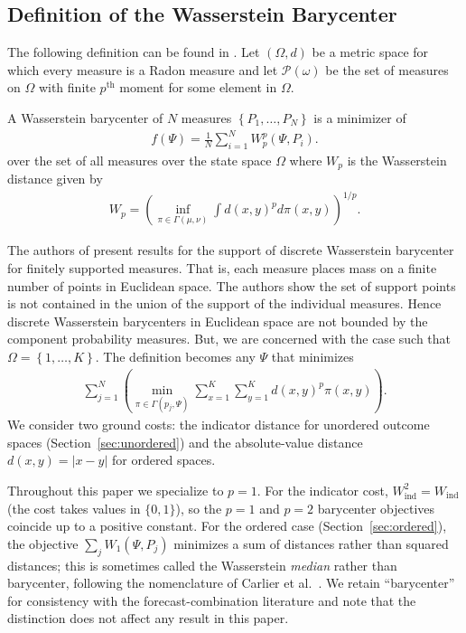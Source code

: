 \subsection{Definition of the Wasserstein Barycenter}
The following definition can be found in \cite{cuturi}.  Let $(\Omega,d)$ be a metric space for which every measure is a Radon measure and let $\mathcal{P}(\omega)$ be the set of measures on $\Omega$ with finite $p^{\text{th}}$ moment for some element in $\Omega$.
\begin{definition}
A Wasserstein barycenter of $N$ measures $\left\{P_1,\ldots,P_N\right\}$ is a minimizer of
\begin{align*}
f(\Psi)=\frac{1}{N}\sum_{i=1}^NW^p_p(\Psi,P_i).
\end{align*}
over the set of all measures over the state space $\Omega$ where $W_p$ is the Wasserstein distance given by
\begin{align*}
W_p=\left(\inf_{\pi\in\Gamma(\mu,\nu)}\int d(x,y)^pd\pi(x,y)\right)^{1/p}.
\end{align*}
\end{definition}
The authors of \cite{dbary} present results for the support of discrete Wasserstein barycenter for finitely supported measures.  That is, each measure places mass on a finite number of points in Euclidean space.  The authors show the set of support points is not contained in the union of the support of the individual measures.   Hence discrete Wasserstein barycenters in Euclidean space are not bounded by the component probability measures.  But, we are concerned with the case such that $\Omega=\left\{1,\ldots,K\right\}$.  The definition becomes any $\Psi$ that minimizes
\begin{align*}
\sum_{j=1}^N\left(\min_{\pi\in\Gamma(p_j,\Psi)}\sum_{x=1}^K\sum_{y=1}^K d(x,y)^p\pi(x,y)\right).
\end{align*}
We consider two ground costs: the indicator distance for unordered outcome spaces (Section~\ref{sec:unordered}) and the absolute-value distance $d(x,y)=|x-y|$ for ordered spaces.
\begin{remark}[Barycenter, median, and specialization to $p=1$]
Throughout this paper we specialize to $p=1$.  For the indicator cost, $W_{\mathrm{ind}}^2 = W_{\mathrm{ind}}$ (the cost takes values in $\{0,1\}$), so the $p=1$ and $p=2$ barycenter objectives coincide up to a positive constant.  For the ordered case (Section~\ref{sec:ordered}), the objective $\sum_j W_1(\Psi, P_j)$ minimizes a sum of distances rather than squared distances; this is sometimes called the Wasserstein \emph{median} rather than barycenter, following the nomenclature of Carlier et al.\ \cite{carlier23}.  We retain ``barycenter'' for consistency with the forecast-combination literature \cite{agueh2011barycenters,lecoz23} and note that the distinction does not affect any result in this paper.
\end{remark}

